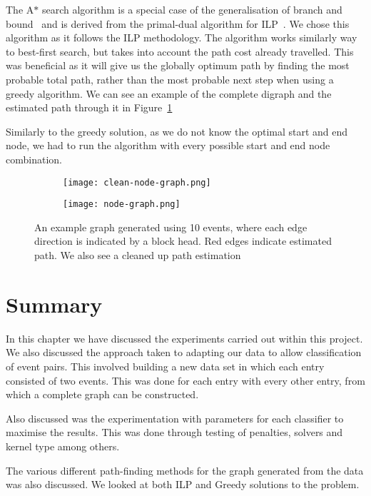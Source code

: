 \documentclass[bsc,frontabs,twoside,singlespacing,parskip,deptreport]{infthesis}     %
\begin{document}
The A$*$ search algorithm is a special case of the generalisation of branch and bound~\cite{balas1983branch} and is derived from the primal-dual algorithm for ILP~\cite{ye2012note}.
We chose this algorithm as it follows the ILP methodology. The algorithm works similarly way to best-first search, but takes into account the path cost already travelled.
This was beneficial as it will give us the globally optimum path by finding the most probable total path, rather than the most probable next step when using a
greedy algorithm. We can see an example of the complete digraph and the estimated path through it in Figure~\ref{figure:minigraph}

Similarly to the greedy solution, as we do not know the optimal start and end node, we had to run the algorithm with every possible start and end node combination.
\begin{figure}
\centering
\begin{subfigure}{.5\textwidth}
  \centering
  \texttt{[image: clean-node-graph.png]}
\end{subfigure}%
\begin{subfigure}
  \centering
  \texttt{[image: node-graph.png]}
\end{subfigure}
\caption{An example graph generated using 10 events, where each edge direction is indicated by a block head. Red edges indicate estimated path. We also see a cleaned up path estimation }
\label{figure:minigraph}
\end{figure}

\section{Summary}
In this chapter we have discussed the experiments carried out within this project.
We also discussed the approach taken to adapting our data to allow classification of event pairs. This involved building a new data set
in which each entry consisted of two events. This was done for each entry with every other entry, from which a complete
graph can be constructed.

Also discussed was the experimentation with parameters for each classifier to maximise the results. This was done through
testing of penalties, solvers and kernel type among others.

The various different path-finding methods for the graph generated from the data was also discussed.
We looked at both ILP and Greedy solutions to the problem.
\end{document}

